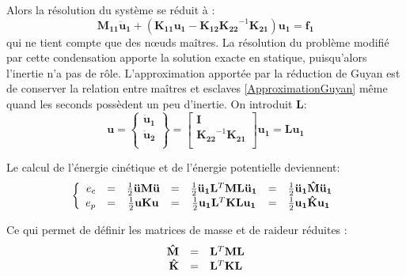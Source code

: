 \documentclass[12pt,a4paper]{report}
\begin{document}
\noindent
Alors la résolution du système se réduit à :
\begin{equation}
	\mathbf{M_{11}} \mathbf{\ddot{u}_1}
	+ \left(
		\mathbf{K_{11}} \mathbf{u_1}
		- \mathbf{K_{12}}
			\mathbf{K_{22}}^{-1}
			\mathbf{K_{21}}
	  \right) \mathbf{u_1}
	= \mathbf{f_1}
\end{equation}
qui ne tient compte que des nœuds maîtres. La résolution du problème modifié par cette condensation apporte la solution exacte en statique, puisqu'alors l'inertie n'a pas de rôle. L'approximation apportée par la réduction de Guyan est de conserver la relation entre maîtres et esclaves \ref{ApproximationGuyan} même quand les seconds possèdent un peu d'inertie. On introduit $\mathbf{L}$:
\begin{equation}
\mathbf{u} 
= 
\begin{Bmatrix}
   \mathbf{\ddot{u}_1} \\
   \mathbf{\ddot{u}_2} \\
\end{Bmatrix}
=
\begin{bmatrix}
   \mathbf{I} \\
   \mathbf{K_{22}}^{-1}
	\mathbf{K_{21}} \\
\end{bmatrix}
\mathbf{u_1}
=
\mathbf{L}
\mathbf{u_1}
\end{equation}

\noindent
Le calcul de l'énergie cinétique et de l'énergie potentielle deviennent:
\begin{equation}
\left\{
	\begin{array}{r c c c c c l}
		e_c &=&
			\frac{1}{2} \mathbf{\ddot{u}} \mathbf{M} \mathbf{\ddot{u}}
			&=&
			\frac{1}{2} \mathbf{\ddot{u}}_{\mathbf{1}} \mathbf{L}^T
							\mathbf{M} \mathbf{L}
							\mathbf{\ddot{u}_1}
			&=&
			\frac{1}{2} \mathbf{\ddot{u}_1} 
							\mathbf{\hat{M}} \mathbf{\ddot{u}_1}
		\\
		e_p &=&
			\frac{1}{2} \mathbf{u} \mathbf{K} \mathbf{u}
			&=&
			\frac{1}{2} \mathbf{u_1} \mathbf{L}^T
							\mathbf{K} \mathbf{L} \mathbf{u_1}
			&=&
			\frac{1}{2} \mathbf{u_1}
							\mathbf{\hat{K}} \mathbf{u_1}
	\end{array}
\right.
\end{equation}

\noindent
Ce qui permet de définir les matrices de masse et de raideur réduites :
\begin{equation}
	\begin{array}{r c l}
		\mathbf{\hat{M}} &=& \mathbf{L}^T \mathbf{M} \mathbf{L}
		\\		
		\mathbf{\hat{K}} &=& \mathbf{L}^T \mathbf{K} \mathbf{L}
	\end{array}
\end{equation}
\end{document}
